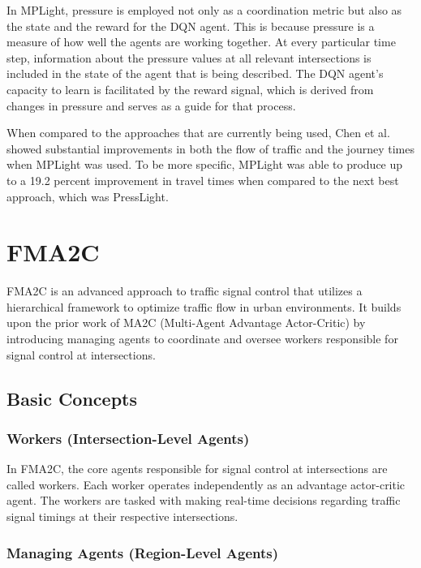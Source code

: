 In MPLight, pressure is employed not only as a coordination metric but also as the state and the reward for the DQN agent. This is because pressure is a measure of how well the agents are working together. At every particular time step, information about the pressure values at all relevant intersections is included in the state of the agent that is being described. The DQN agent's capacity to learn is facilitated by the reward signal, which is derived from changes in pressure and serves as a guide for that process.

When compared to the approaches that are currently being used, Chen et al.\cite{chen2020toward} showed substantial improvements in both the flow of traffic and the journey times when MPLight was used. To be more specific, MPLight was able to produce up to a 19.2 percent improvement in travel times when compared to the next best approach, which was PressLight.


\section{FMA2C}\label{sec:FMA2C}

FMA2C\cite{chu2019multi} is an advanced approach to traffic signal control that utilizes a hierarchical framework to optimize traffic flow in urban environments. It builds upon the prior work of MA2C (Multi-Agent Advantage Actor-Critic) by introducing managing agents to coordinate and oversee workers responsible for signal control at intersections.

\subsection{Basic Concepts}

\subsubsection{Workers (Intersection-Level Agents)}

In FMA2C, the core agents responsible for signal control at intersections are called workers. Each worker operates independently as an advantage actor-critic agent. The workers are tasked with making real-time decisions regarding traffic signal timings at their respective intersections.

\subsubsection{Managing Agents (Region-Level Agents)}

